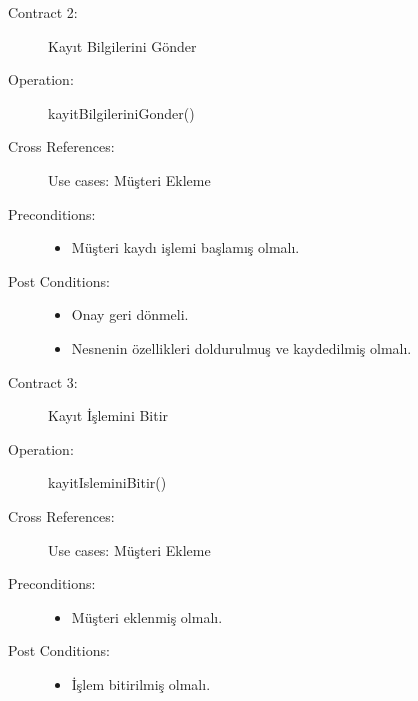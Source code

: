 \documentclass[12pt,a4paper]{report}
\begin{document}
\begin{description}
\item[Contract 2:] Kayıt Bilgilerini Gönder 
\item[Operation:] kayitBilgileriniGonder()
\item[Cross References:] Use cases: Müşteri Ekleme
\item[Preconditions:] \hspace{10 mm}
\begin{itemize}
\item Müşteri kaydı işlemi başlamış olmalı.
\end{itemize}
\item[Post Conditions:] \hspace{10 mm}
\begin{itemize} 
\item Onay geri dönmeli.
\item Nesnenin özellikleri doldurulmuş ve kaydedilmiş olmalı. \\
\end{itemize}
\end{description}

\begin{description}
\item[Contract 3:] Kayıt İşlemini Bitir 
\item[Operation:] kayitIsleminiBitir()
\item[Cross References:] Use cases: Müşteri Ekleme
\item[Preconditions:] \hspace{10 mm}
\begin{itemize}
\item Müşteri eklenmiş olmalı.
\end{itemize}
\item[Post Conditions:] \hspace{10 mm}
\begin{itemize} 
\item İşlem bitirilmiş olmalı. \\
\end{itemize}
\end{description}

\newpage
\end{document}
